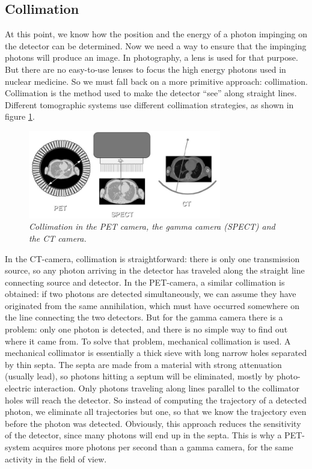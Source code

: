 \documentclass[11pt,oneside]{article}
\begin{document}
\subsection{Collimation}

At this point, we know how the position and the energy of a photon
impinging on the detector can be determined. Now we need a way to
ensure that the impinging photons will produce an image. In
photography, a lens is used for that purpose. But there are no
easy-to-use lenses to focus the high energy photons used in nuclear
medicine. So we must fall back on a more primitive approach:
collimation. Collimation is the method used to make the detector
``see'' along straight lines. Different tomographic systems use
different collimation strategies, as shown in figure
\ref{fig:spect_pet_ct}.

\begin{figure}[tb]
\centering
\includegraphics[width=0.75\textwidth]{figs/fig_spect_pet_ct.pdf}
\caption{\label{fig:spect_pet_ct} \emph{Collimation in the PET camera, the
gamma camera (SPECT) and the CT camera.}}
\end{figure}

In the CT-camera, collimation is straightforward: there is only one
transmission source, so any photon arriving in the detector has traveled along
the straight line connecting source and detector. In the PET-camera, a similar
collimation is obtained: if two photons are detected simultaneously, we can
assume they have originated from the same annihilation, which must have
occurred somewhere on the line connecting the two detectors. But for the gamma
camera there is a problem: only one photon is detected, and there is no simple
way to find out where it came from. To solve that problem, mechanical
collimation is used. A mechanical collimator is essentially a thick sieve with
long narrow holes separated by thin septa. The septa are made from a material
with strong attenuation (usually lead), so photons hitting a septum will be
eliminated, mostly by photo-electric interaction. Only photons traveling along
lines parallel to the collimator holes will reach the detector. So instead of
computing the trajectory of a detected photon, we eliminate all trajectories
but one, so that we know the trajectory even before the photon was detected.
Obviously, this approach reduces the sensitivity of the detector, since many
photons will end up in the septa. This is why a PET-system acquires more
photons per second than a gamma camera, for the same activity in the field of
view.
\end{document}

